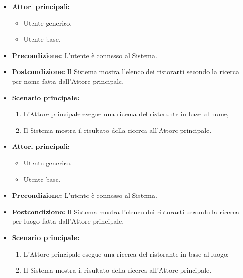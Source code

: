 \label{usecase:Ricerca ristoranti per nome}
\begin{itemize}
	\item \textbf{Attori principali:} 
	\begin{itemize}
		\item Utente generico.
		\item Utente base.
	\end{itemize}

	\item \textbf{Precondizione:} L'utente è connesso al Sistema.

	\item \textbf{Postcondizione:} Il Sistema mostra l'elenco dei ristoranti secondo la ricerca per nome fatta dall'Attore principale.

	\item \textbf{Scenario principale:}
	      \begin{enumerate}
		      \item L'Attore principale esegue una ricerca del ristorante in base al nome;
		      \item Il Sistema mostra il risultato della ricerca all'Attore principale.
	      \end{enumerate}
\end{itemize}

\label{usecase:Ricerca ristoranti per luogo}
\begin{itemize}
	\item \textbf{Attori principali:} 
	\begin{itemize}
		\item Utente generico.
		\item Utente base.
	\end{itemize}

	\item \textbf{Precondizione:} L'utente è connesso al Sistema.

	\item \textbf{Postcondizione:} Il Sistema mostra l'elenco dei ristoranti secondo la ricerca per luogo fatta dall'Attore principale.

	\item \textbf{Scenario principale:}
	      \begin{enumerate}
		      \item L'Attore principale esegue una ricerca del ristorante in base al luogo;
		      \item Il Sistema mostra il risultato della ricerca all'Attore principale.
	      \end{enumerate}
\end{itemize}


